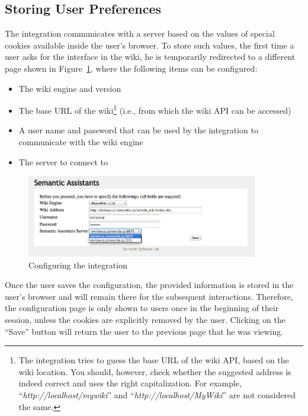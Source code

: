 \subsection{Storing User Preferences} The \wikinlp integration communicates with a \sa server based on the values of special cookies available inside the user's browser. To store such values, the first time a user asks for the \wikinlp interface in the wiki, he is temporarily redirected to a different page shown in Figure~\ref{fig:wiki_config}, where the following items can be configured:

\begin{itemize}\itemsep1mm
\item The wiki engine and version
\item The base URL of the wiki\footnote{The \wikinlp integration tries to guess the base URL of the wiki API, based on the wiki location. You should, however, check whether the suggested address is indeed correct and uses the right capitalization. For example, ``\emph{http://localhost/mywiki}'' and ``\emph{http://localhost/MyWiki}'' are not considered the same.} (i.e., from which the wiki API can be accessed)
\item A user name and password that can be used by the \wikinlp integration to communicate with the wiki engine
\item The \sa server to connect to
\end{itemize}

\begin{figure}[ht]
\centering
\includegraphics[width=0.9\textwidth]{pictures/wiki_config.png}
\caption{Configuring the \wikinlp integration}
\label{fig:wiki_config}
\end{figure}

Once the user saves the configuration, the provided information is stored in the user's browser and will remain there for the subsequent \wikinlp interactions. Therefore, the configuration page is only shown to users once in the beginning of their session, unless the cookies are explicitly removed by the user. Clicking on the ``Save'' button will return the user to the previous page that he was viewing.

